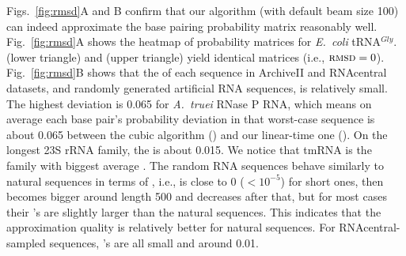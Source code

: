 

Figs.~\ref{fig:rmsd}A and B confirm that our \linearpartition algorithm (with default beam size 100) can indeed approximate the base pairing probability matrix reasonably well. 
Fig.~\ref{fig:rmsd}A shows the heatmap of probability matrices for {\it E.~coli} tRNA$^\textit{Gly}$. 
\rnafold (lower triangle) and \linearpartition (upper triangle)
yield identical matrices (i.e., $\text{\sc rmsd}=0$). %
Fig.~\ref{fig:rmsd}B shows that the \RMSD of each sequence in ArchiveII and RNAcentral datasets, 
and randomly generated artificial RNA sequences, %
is relatively small. %
The highest deviation is 0.065 for {\it A.~truei} RNase P RNA, 
which means on average 
each base pair's probability deviation in that worst-case sequence is about 0.065 between the cubic algorithm (\rnafold) and our linear-time one (\linearpartition). 
On the longest 23S rRNA family, the \RMSD is about 0.015. 
We notice that tmRNA is the family with biggest average \RMSD. %
The random RNA sequences behave similarly to natural sequences in terms of \RMSD, 
i.e., \RMSD is  close to 0 ($\!<\!10^{-5}$) for short ones, then becomes bigger around length 500 and decreases after that, 
but for most cases their \RMSD's are slightly larger than  
the natural sequences. %
This indicates that the approximation quality is relatively better for natural sequences.
For RNAcentral-sampled sequences, \RMSD's are all small and around 0.01.




